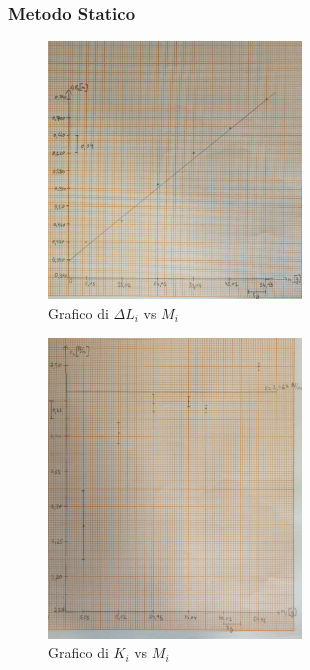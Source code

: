 \documentclass[a4paper]{article}
\begin{document}
{\subsubsection{Metodo Statico}
\FloatBarrier
\begin{figure}[!ht]
    \centering
    \includegraphics[width=0.6\textwidth]{fotomolla/Molla 2/m2statico_lm.jpg}
    \caption{Grafico di $\Delta L_i$ vs $M_i$}
\end{figure}

\begin{figure}[!ht]
    \centering
    \includegraphics[width=0.6\textwidth]{fotomolla/Molla 2/m2statico_km.jpg}
    \caption{Grafico di $K_i$ vs $M_i$}
\end{figure}
\FloatBarrier

}
\end{document}
